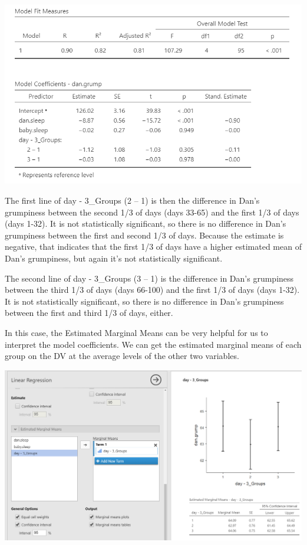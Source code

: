 \documentclass[
]{book}
\begin{document}
\includegraphics{images/13-regression/regression-categorical.png}

The first line of day - 3\_Groups (2 -- 1) is then the difference in Dan's grumpiness between the second 1/3 of days (days 33-65) and the first 1/3 of days (days 1-32). It is not statistically significant, so there is no difference in Dan's grumpiness between the first and second 1/3 of days. Because the estimate is negative, that indicates that the first 1/3 of days have a higher estimated mean of Dan's grumpiness, but again it's not statistically significant.

The second line of day - 3\_Groups (3 -- 1) is the difference in Dan's grumpiness between the third 1/3 of days (days 66-100) and the first 1/3 of days (days 1-32). It is not statistically significant, so there is no difference in Dan's grumpiness between the first and third 1/3 of days, either.

In this case, the Estimated Marginal Means can be very helpful for us to interpret the model coefficients. We can get the estimated marginal means of each group on the DV at the average levels of the other two variables.

\includegraphics{images/13-regression/regression-categorical-EMM.png}
\end{document}
